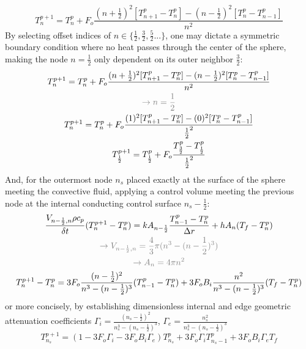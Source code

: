 \documentclass[12pt]{article}
\begin{document}
\begin{equation}
    \label{eq:efd}
    T_n^{p+1} = T_n^p + F_o \frac{(n+\frac{1}{2})^2[T_{n+1}^p-T_n^p] - (n-\frac{1}{2})^2[T_n^p-T_{n-1}^p]}{n^2}
\end{equation}
By selecting offset indices of $n\in\{\frac{1}{2}, \frac{3}{2}, \frac{5}{2}...\}$, one may dictate a symmetric boundary condition where no heat passes through the center of the sphere, making the node $n=\frac{1}{2}$ only dependent on its outer neighbor $\frac{3}{2}$:
\begin{gather*}
    T_n^{p+1} = T_n^p + F_o \frac{(n+\frac{1}{2})^2[T_{n+1}^p-T_n^p] - (n-\frac{1}{2})^2[T_n^p-T_{n-1}^p]}{n^2}\\
    \color{gray}\rightarrow n=\frac{1}{2}\\
    T_n^{p+1} = T_n^p + F_o \frac{(1)^2[T_{n+1}^p-T_n^p] - (0)^2[T_n^p-T_{n-1}^p]}{\frac{1}{2}^2}\\
    T_{\frac{1}{2}}^{p+1} = T_{\frac{1}{2}}^p + F_o \frac{T_{\frac{3}{2}}^p-T_{\frac{1}{2}}^p}{\frac{1}{2}^2}\\
\end{gather*}
And, for the outermost node $n_s$ placed exactly at the surface of the sphere meeting the convective fluid, applying a control volume meeting the previous node at the internal conducting control surface $n_s-\frac{1}{2}$:
\newcommand{\note}{\color{gray}\rightarrow}
\begin{gather*}
    \frac{V_{n-\frac{1}{2},n}\rho c_p}{\delta t}(T_n^{p+1} - T_n^p)=kA_{n-\frac{1}{2}}\frac{T_{n-1}^p-T_n^p}{\Delta r} + hA_n(T_f-T_n^p)\\
    \note V_{n-\frac{1}{2},n} = \frac{4}{3}\pi (n^3-(n-\frac{1}{2})^3)\\
    \note A_n = 4\pi n^2\\
    T_n^{p+1} - T_n^p = 3F_o\frac{(n-\frac{1}{2})^2}{n^3-(n-\frac{1}{2})^3}(T_{n-1}^p-T_n^p) + 3F_oB_i\frac{n^2}{n^3-(n-\frac{1}{2})^3}(T_f-T_n^p)\\
\end{gather*}
or more concisely, by establishing dimensionless internal and edge geometric attenuation coefficients $\Gamma_i=\frac{(n_s-\frac{1}{2})^2}{n_s^3-(n_s-\frac{1}{2})^3}$, $\Gamma_e=\frac{n_s^2}{n_s^3-(n_s-\frac{1}{2})^3}$
\begin{equation}
    \label{eq:fd-surface}
    T_{n_s}^{p+1} = (1-3F_o\Gamma_i-3F_oB_i\Gamma_e)T_{n_s}^p + 3F_o\Gamma_iT_{n_s-1}^p + 3F_oB_i\Gamma_eT_f
\end{equation}
\end{document}
